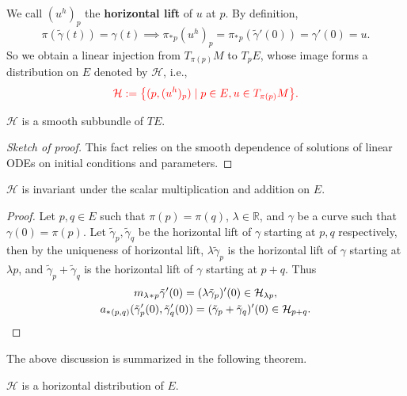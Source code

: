 We call $(u^h)_p$ the \textbf{horizontal lift} of $u$ at $p$.
By definition, 
\begin{equation*}
    \pi(\tilde{\gamma}(t)) = \gamma(t) \implies 
    \pi_*{}_p(u^h)_p = \pi_*{}_p(\tilde{\gamma}'(0)) = \gamma'(0) = u.
\end{equation*}
So we obtain a linear injection from $T_{\pi(p)} M$ to $T_p E$, 
whose image forms a distribution on $E$ denoted by $\mathcal{H}$, i.e., 
\begin{equation*}
    \textcolor{red}{\mathcal{H} := \big\{(p,(u^h)_p)\mid p\in E, u\in T_{\pi(p)} M\big\}.}
\end{equation*}
\begin{fact}
    $\mathcal{H}$ is a smooth subbundle of $TE$. 
\end{fact}
\begin{proof}[Sketch of proof]
    This fact relies on the smooth dependence of solutions of linear ODEs on initial conditions and parameters.
\end{proof}
\begin{fact}
    $\mathcal{H}$ is invariant under the scalar multiplication and addition on $E$.
\end{fact}
\begin{proof}
    Let $p,q\in E$ such that $\pi(p) = \pi(q)$, $\lambda\in \mathbb{R}$, and $\gamma$ be a curve such that $\gamma(0) = \pi(p)$. 
    Let $\tilde{\gamma}_p,\tilde{\gamma}_q$ be the horizontal lift of $\gamma$ starting at $p,q$ respectively, 
    then by the uniqueness of horizontal lift, $\lambda \tilde{\gamma}_p$ is the horizontal lift of $\gamma$ starting at $\lambda p$,
    and $\tilde{\gamma}_p + \tilde{\gamma}_q$ is the horizontal lift of $\gamma$ starting at $p+q$. Thus 
    \begin{gather*}
        m_{\lambda}{}_*{}_p \tilde{\gamma}'(0) = (\lambda \tilde{\gamma}_p)'(0) \in \mathcal{H}_{\lambda p}, \\
        a_*{}_{(p,q)}(\tilde{\gamma}_p'(0), \tilde{\gamma}_q'(0)) = (\tilde{\gamma}_p + \tilde{\gamma}_q)'(0) \in \mathcal{H}_{p+q}. \qedhere
    \end{gather*}
\end{proof}
The above discussion is summarized in the following theorem.
\begin{theorem}
    $\mathcal{H}$ is a horizontal distribution of $E$. 
\end{theorem}


